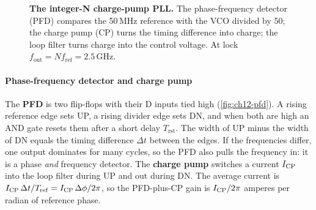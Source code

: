 \begin{figure}[tbp]
\centering
{}
\caption{\textbf{The \OS{} integer-N charge-pump PLL.} The phase-frequency detector (PFD) compares the 50\,MHz reference with the VCO divided by 50; the charge pump (CP) turns the timing difference into charge; the loop filter turns charge into the control voltage. At lock $f_\mathrm{out} = N f_\mathrm{ref} = 2.5$\,GHz.}
\label{fig:ch12-arch}
\end{figure}

\paragraph{Phase-frequency detector and charge pump}
The \textbf{PFD} is two flip-flops with their D inputs tied high (\cref{fig:ch12-pfd}). A rising reference edge sets UP, a rising divider edge sets DN, and when both are high an AND gate resets them after a short delay $T_\mathrm{rst}$. The width of UP minus the width of DN equals the timing difference $\Delta t$ between the edges. If the frequencies differ, one output dominates for many cycles, so the PFD also pulls the frequency in: it is a phase \emph{and} frequency detector. The \textbf{charge pump} switches a current $I_\mathrm{CP}$ into the loop filter during UP and out during DN. The average current is $I_\mathrm{CP}\,\Delta t/T_\mathrm{ref} = I_\mathrm{CP}\,\Delta\phi/2\pi$, so the PFD-plus-CP gain is $I_\mathrm{CP}/2\pi$ amperes per radian of reference phase.


